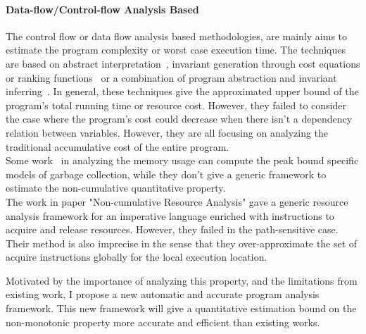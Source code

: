 {\paragraph*{Data-flow/Control-flow Analysis Based}
The control flow or data flow analysis based methodologies,
are mainly aims to estimate the program complexity or worst case execution time. 
The techniques are based on
abstract interpretation~\cite{GustafssonEL05, HumenbergerJK18},
invariant generation through cost equations or ranking functions~\cite{BrockschmidtEFFG16,AlbertAGP08,AliasDFG10,Flores-MontoyaH14}
or a combination of program abstraction and invariant inferring~\cite{GulwaniZ10, SinnZV17, GulwaniJK09}.
In general, these techniques give the approximated upper bound of the program's total running time or resource cost.
However, they failed to consider the case where the program's cost could decrease when there isn't a dependency relation between variables.
However, they are all focusing on analyzing the traditional accumulative cost of the entire program. 
\\
Some work~\cite{AlbertFR14, BrabermanGHY14, HofmannJ03} in analyzing the memory usage can compute the peak bound specific models of garbage collection,
while they don't give a generic framework to estimate the non-cumulative quantitative property.
\\
The work in paper "Non-cumulative Resource Analysis" gave a generic resource analysis framework for an imperative language enriched with instructions to acquire and release resources. 
However, they failed in the path-sensitive case. Their method is also imprecise in the sense that they over-approximate the
set of acquire instructions globally for the local execution location.
}
Motivated by the importance of analyzing this property, and the limitations from existing work, I propose a new
automatic and accurate program analysis framework.
This new framework will give
a quantitative estimation bound on the non-monotonic property more accurate and efficient
than existing works.

